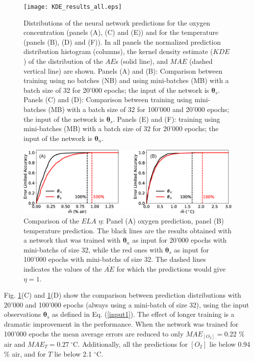 \documentclass[sensors,article,submit,moreauthors,pdftex,10pt,a4paper]{Definitions/mdpi}
\begin{document}
\begin{figure}[htbp]
\centering
\texttt{[image: KDE\_results\_all.eps]}
\caption{Distributions of the neural network predictions for the oxygen concentration (panels (A), (C) and (E)) and for the temperature (panels (B), (D) and (F)). In all panels the normalized prediction distribution histogram (columns), the kernel density estimate ($KDE$) of the distribution of the $AE$s (solid line), and $MAE$ (dashed vertical line) are shown. Panels (A) and (B): Comparison between training using no batches (NB) and using mini-batches (MB) with a batch size of 32 for 20'000 epochs; the input of the network is ${\pmb \theta}_s$. Panels (C) and (D): Comparison between training using mini-batches (MB) with a batch size of 32 for 100'000 and 20'000 epochs; the input of the network is ${\pmb \theta}_s$. Panels (E) and (F): 
training using mini-batches (MB) with a batch size of 32 for 20'000 epochs; the input of the network is ${\pmb \theta}_n$.}
\label{fig:KDE_results_all}
\end{figure}

\begin{figure}[t!]
\centering
\includegraphics[width=14 cm]{ELA_comparison_O2_T.eps}
\caption{Comparison of the $ELA$ $\eta$: Panel (A) oxygen prediction, panel (B) temperature prediction. The black lines are the results obtained with a network that was trained with ${\pmb \theta}_n$ as input for 20'000 epochs with mini-batchs of size 32, while the red ones with ${\pmb \theta}_s$ as input for 100'000 epochs with mini-batchs of size 32. The dashed lines indicates the values of the $\overline{AE}$ for which the predictions would give $\eta=1$.}
\label{fig:ELA_result_comparison}
\end{figure}

Fig. \ref{fig:KDE_results_all}(C) and \ref{fig:KDE_results_all}(D) show the comparison between prediction distributions with 20'000 and 100'000 epochs (always using a mini-batch of size 32), using the input observations ${\pmb \theta}_s$ as defined in Eq. (\ref{input1}). The effect of longer training is a dramatic improvement in the performance. When the network was trained for 100'000 epochs the mean average errors are reduced to only $MAE_{[O_2]}=0.22$ \% air and $MAE_{T}=0.27  \ ^\circ$C. Additionally, all the predictions for $[O_2]$ lie below 0.94 \% air, and for $T$ lie below 2.1 $^\circ$C.
\end{document}
